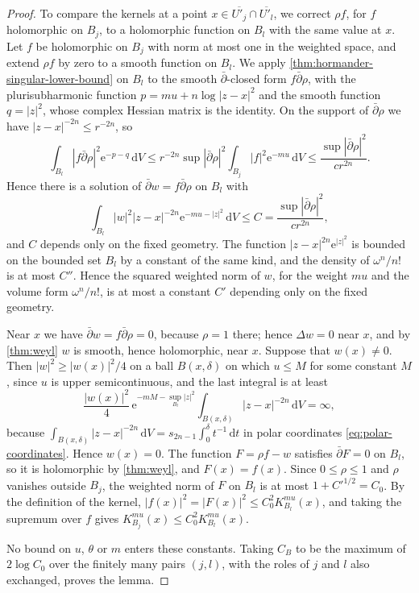 \begin{proof}
To compare the kernels at a point $x\in\overline{U'_j}\cap\overline{U'_l}$, we correct $\rho f$, for $f$ holomorphic on $B_j$, to a holomorphic function on $B_l$ with the same value at $x$. Let $f$ be holomorphic on $B_j$ with norm at most one in the weighted space, and extend $\rho f$ by zero to a smooth function on $B_l$. We apply \cref{thm:hormander-singular-lower-bound} on $B_l$ to the smooth $\bar\partial$-closed form $f\bar\partial\rho$, with the plurisubharmonic function $p=mu+n\log|z-x|^2$ and the smooth function $q=|z|^2$, whose complex Hessian matrix is the identity. On the support of $\bar\partial\rho$ we have $|z-x|^{-2n}\leq r^{-2n}$, so
\[
 \int_{B_l}|f\bar\partial\rho|^2\mathrm e^{-p-q}\,\mathrm dV\leq r^{-2n}\sup|\bar\partial\rho|^2\int_{B_j}|f|^2\mathrm e^{-mu}\,\mathrm dV\leq\frac{\sup|\bar\partial\rho|^2}{cr^{2n}}.
\]
Hence there is a solution of $\bar\partial w=f\bar\partial\rho$ on $B_l$ with
\[
 \int_{B_l}|w|^2|z-x|^{-2n}\mathrm e^{-mu-|z|^2}\,\mathrm dV\leq C=\frac{\sup|\bar\partial\rho|^2}{cr^{2n}},
\]
and $C$ depends only on the fixed geometry. The function $|z-x|^{2n}\mathrm e^{|z|^2}$ is bounded on the bounded set $B_l$ by a constant of the same kind, and the density of $\omega^n/n!$ is at most $C''$. Hence the squared weighted norm of $w$, for the weight $mu$ and the volume form $\omega^n/n!$, is at most a constant $C'$ depending only on the fixed geometry.

Near $x$ we have $\bar\partial w=f\bar\partial\rho=0$, because $\rho=1$ there; hence $\Delta w=0$ near $x$, and by \cref{thm:weyl} $w$ is smooth, hence holomorphic, near $x$. Suppose that $w(x)\neq0$. Then $|w|^2\geq|w(x)|^2/4$ on a ball $B(x,\delta)$ on which $u\leq M$ for some constant $M$, since $u$ is upper semicontinuous, and the last integral is at least
\[
 \frac{|w(x)|^2}4\,\mathrm e^{-mM-\sup_{B_l}|z|^2}\int_{B(x,\delta)}|z-x|^{-2n}\,\mathrm dV=\infty,
\]
because $\int_{B(x,\delta)}|z-x|^{-2n}\,\mathrm dV=s_{2n-1}\int_0^\delta t^{-1}\,\mathrm dt$ in polar coordinates \eqref{eq:polar-coordinates}. Hence $w(x)=0$. The function $F=\rho f-w$ satisfies $\bar\partial F=0$ on $B_l$, so it is holomorphic by \cref{thm:weyl}, and $F(x)=f(x)$. Since $0\leq\rho\leq1$ and $\rho$ vanishes outside $B_j$, the weighted norm of $F$ on $B_l$ is at most $1+C'^{1/2}=C_0$. By the definition of the kernel, $|f(x)|^2=|F(x)|^2\leq C_0^2K^{mu}_{B_l}(x)$, and taking the supremum over $f$ gives $K^{mu}_{B_j}(x)\leq C_0^2K^{mu}_{B_l}(x)$.

No bound on $u$, $\theta$ or $m$ enters these constants. Taking $C_B$ to be the maximum of $2\log C_0$ over the finitely many pairs $(j,l)$, with the roles of $j$ and $l$ also exchanged, proves the lemma.
\end{proof}

